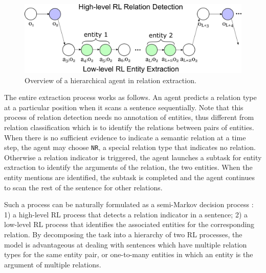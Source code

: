 \documentclass[letterpaper]{article} %
\theoremstyle{definition}
\begin{document}
\begin{figure}[!htp]
    \centering
    \includegraphics[width=\linewidth]{HRL.png}
    \caption{Overview of a hierarchical agent in relation extraction.} %
    \label{hierpolicy}
\end{figure}

The entire extraction process works as follows. An agent predicts a relation type at a particular position when it scans a sentence sequentially. Note that this process of relation detection needs no annotation of entities, thus different from relation classification which is to identify the relations between pairs of entities. When there is no sufficient evidence to indicate a semantic relation at a time step, the agent may choose \texttt{NR}, a special relation type that indicates no relation. Otherwise a relation indicator is triggered, the agent launches a subtask for entity extraction to identify the arguments of the relation, the two entities. When the entity mentions are identified, the subtask is completed and the agent continues to scan the rest of the sentence for other relations.

Such a process can be naturally formulated as a semi-Markov decision process \cite{sutton1999between}: 1) a high-level RL process that detects a relation indicator in a sentence; 2) a low-level RL process that identifies the associated entities for the corresponding relation.
By decomposing the task into a hierarchy of two RL processes, the model is advantageous at dealing with sentences which have multiple relation types for the same entity pair, or one-to-many entities in which an entity is the argument of multiple relations.
\end{document}
